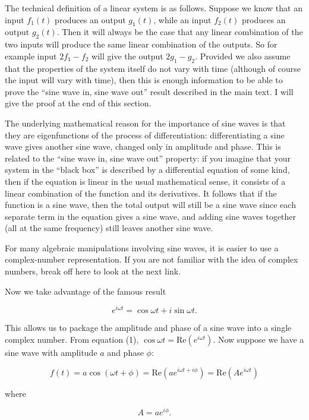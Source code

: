  The technical definition of a linear system is as follows. Suppose we know 
  that an input $f_1(t)$ produces an output $g_1(t)$, while an input $f_2(t)$ 
  produces an output $g_2(t)$. Then it will always be the case that any linear 
  combination of the two inputs will produce the same linear combination of the 
  outputs. So for example input $2f_1-f_2$ will give the output $2g_1-g_2$. 
  Provided we also assume that the properties of the system itself do not vary 
  with time (although of course the input will vary with time), then this is 
  enough information to be able to prove the ``sine wave in, sine wave out'' 
  result described in the main text. I will give the proof at the end of this 
  section. 

  The underlying mathematical reason for the importance of sine waves is that 
  they are eigenfunctions of the process of differentiation: differentiating a 
  sine wave gives another sine wave, changed only in amplitude and phase. This 
  is related to the ``sine wave in, sine wave out'' property: if you imagine 
  that your system in the ``black box'' is described by a differential equation 
  of some kind, then if the equation is linear in the usual mathematical sense, 
  it consists of a linear combination of the function and its derivatives. It 
  follows that if the function is a sine wave, then the total output will still 
  be a sine wave since each separate term in the equation gives a sine wave, 
  and adding sine waves together (all at the same frequency) still leaves 
  another sine wave. 

  For many algebraic manipulations involving sine waves, it is easier to use a 
  complex-number representation. If you are not familiar with the idea of 
  complex numbers, break off here to look at the next link. 

  Now we take advantage of the famous result 

  $$e^{i \omega t}=\cos \omega t+i\sin \omega t . \tag{1}$$ 

  This allows us to package the amplitude and phase of a sine wave into a 
  single complex number. From equation (1), $\cos\omega t=\mathrm{Re}(e^{i 
  \omega t})$. Now suppose we have a sine wave with amplitude $a$ and phase 
  $\phi$: 

  $$f(t)=a\cos(\omega t + \phi)=\mathrm{Re}(ae^{i \omega 
  t+i\phi})=\mathrm{Re}(Ae^{i \omega t}) \tag{2}$$ 

  where 

  $$A=ae^{i\phi}. \tag{3}$$ 

